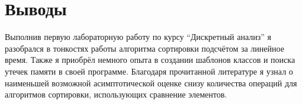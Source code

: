 \section{Выводы}
Выполнив первую лабораторную работу по курсу \enquote{Дискретный анализ} я разобрался в тонкостях работы алгоритма сортировки подсчётом за линейное время. Также я приобрёл немного опыта в создании шаблонов классов и поиска утечек памяти в своей программе. Благодаря прочитанной литературе я узнал о наименьшей возможной асимптотической оценке снизу количества операций для алгоритмов сортировки, использующих сравнение элементов.
\pagebreak
